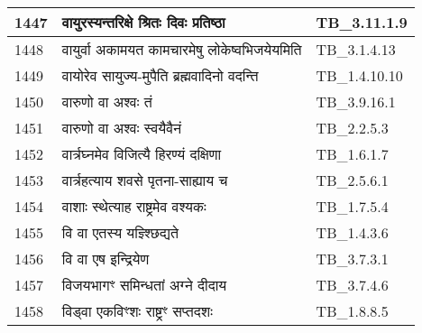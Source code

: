 \documentclass[17pt]{extarticle}
\begin{document}
\begin{longtable}{||p{0.4in}||p{4.9in}||p{0.9in}||}
    \hline
        
    1447 & वायुरस्यन्तरिक्षे श्रितः दिवः प्रतिष्ठा & TB\_3.11.1.9       \\
    
    \hline
        
    1448 & वायुर्वा अकामयत कामचारमेषु लोकेष्वभिजयेयमिति & TB\_3.1.4.13       \\
    
    \hline
        
    1449 & वायोरेव सायुज्य{-}मुपैति ब्रह्मवादिनो वदन्ति & TB\_1.4.10.10       \\
    
    \hline
        
    1450 & वारुणो वा अश्वः तं & TB\_3.9.16.1       \\
    
    \hline
        
    1451 & वारुणो वा अश्वः स्वयैवैनं & TB\_2.2.5.3       \\
    
    \hline
        
    1452 & वार्त्रघ्नमेव विजित्यै हिरण्यं दक्षिणा & TB\_1.6.1.7       \\
    
    \hline
        
    1453 & वार्त्रहत्याय शवसे पृतना{-}साह्याय च & TB\_2.5.6.1       \\
    
    \hline
        
    1454 & वाशाः स्थेत्याह राष्ट्रमेव वश्यकः & TB\_1.7.5.4       \\
    
    \hline
        
    1455 & वि वा एतस्य यज्ञ्श्छिद्यते & TB\_1.4.3.6       \\
    
    \hline
        
    1456 & वि वा एष इन्द्रियेण & TB\_3.7.3.1       \\
    
    \hline
        
    1457 & विजयभागꣳ समिन्धतां अग्ने दीदाय & TB\_3.7.4.6       \\
    
    \hline
        
    1458 & विड्वा एकविꣳशः राष्ट्रꣳ सप्तदशः & TB\_1.8.8.5       \\
    
    \hline
        

\end{longtable}
\end{document}
